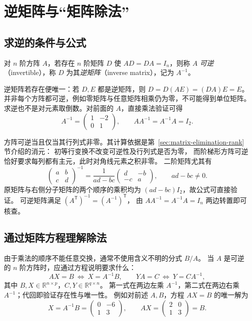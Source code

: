 \documentclass[UTF8,12pt,a4paper,fontset=fandol]{ctexart}
\begin{document}
\section{逆矩阵与“矩阵除法”}

\subsection{求逆的条件与公式}

\begin{definition}[逆矩阵]
对 $n$ 阶方阵 $A$，若存在 $n$ 阶矩阵 $D$ 使 $AD=DA=I_n$，则称 $A$
\emph{可逆}（invertible），称 $D$ 为其\emph{逆矩阵}（inverse matrix），记为 $A^{-1}$。
\end{definition}

逆矩阵若存在便唯一：若 $D,E$ 都是逆矩阵，则 $D=D(AE)=(DA)E=E$。
并非每个方阵都可逆，例如零矩阵与任意矩阵相乘仍为零，不可能得到单位矩阵。
求逆也不是对元素取倒数。对前面的 $A$，直接乘法验证可得
\[
  A^{-1}=\begin{pmatrix}1&-2\\0&1\end{pmatrix},\qquad
  AA^{-1}=A^{-1}A=I_2.
\]

方阵可逆当且仅当其行列式非零。其计算依据是第~\ref{sec:matrix-elimination-rank} 节介绍的消元：
初等行变换不改变可逆性及行列式是否为零，
而阶梯形方阵可逆恰好要求每列都有主元，此时对角线元素之积非零。
二阶矩阵尤其有
\begin{equation}
  \begin{pmatrix}a&b\\c&d\end{pmatrix}^{-1}
  =\frac{1}{ad-bc}\begin{pmatrix}d&-b\\-c&a\end{pmatrix},
  \qquad ad-bc\ne0.
  \label{eq:matrix-inverse-two-by-two}
\end{equation}
原矩阵与右侧分子矩阵的两个顺序的乘积均为 $(ad-bc)I_2$，故公式可直接验证。
可逆矩阵满足 $(A^{\mathsf T})^{-1}=(A^{-1})^{\mathsf T}$，
由 $AA^{-1}=A^{-1}A=I_n$ 两边转置即可核查。

\subsection{通过矩阵方程理解除法}

由于乘法的顺序不能任意交换，通常不使用含义不明的分式 $B/A$。
当 $A$ 是可逆的 $n$ 阶方阵时，应通过方程说明要求什么：
\begin{equation}
  AX=B\ \Longleftrightarrow\ X=A^{-1}B,\qquad
  YA=C\ \Longleftrightarrow\ Y=CA^{-1},
  \label{eq:matrix-equations-inverse}
\end{equation}
其中 $B,X\in\mathbb R^{n\times p}$，$C,Y\in\mathbb R^{q\times n}$。
第一式在两边左乘 $A^{-1}$，第二式在两边右乘 $A^{-1}$；代回即验证存在性与唯一性。
例如对前述 $A,B$，方程 $AX=B$ 的唯一解为
\[
  X=A^{-1}B=\begin{pmatrix}0&-6\\1&3\end{pmatrix},\qquad
  AX=\begin{pmatrix}2&0\\1&3\end{pmatrix}=B.
\]
\end{document}
